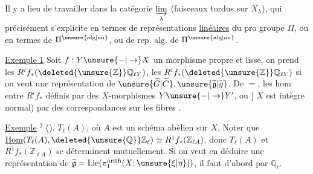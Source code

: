 Il y a lieu de travailler dans la catégorie $\underset{\lambda}{\varinjlim}$ (faisceaux  tordus sur $X_\lambda$), qui précisément s'explicite en termes de représentations \uline{linéaires}  du pro groupe $\Pi$, ou en termes de $\Pi^{\unsure{\mathrm{alg}|\mathrm{an}}}$, ou de rep. alg. de $\Pi^{\unsure{\mathrm{alg}|\mathrm{an}}}$.

\uline{Exemple 1} Soit $f:Y\unsure{-|\to}X$ un morphisme propre et lisse, on prend les $R^i f_*(\deleted{\unsure{\mathbb{Z}}}\mathbb{Q}_{\ell Y})$,   les $R^i f_*(\deleted{\unsure{\mathbb{Z}}}\mathbb{Q}_{\ell Y})$ si on veut une représentation de $\unsure{\widetilde G|\widetilde C},\unsure{\widetilde{\mathfrak g}|\widetilde g}$. De $=$, les hom entre $R^i f_*$ définis par des $X$-morphismes $Y\unsure{-|\to}Y'$, ou $[$ $X$ est intègre normal) par des  correspondances  sur les fibres .

\uline{Exemple} $^2$ (). $T_\ell(A)$, où $A$ est un schéma abélien sur $X$,  Noter que $\underline{\operatorname{Hom}}(T_\ell(A),\deleted{\unsure{\mathbb{Q}}}\mathbb{Z}_\ell)\simeq R^1 f_*(\mathbb{Z}_{\ell A})$, donc $T_\ell(A)$ et $R^1 f_*(\mathbb{Z}_{\ell A})$ se déterminent mutuellement.  Si on veut en déduire une représentation de $\widetilde{\mathfrak g}=\operatorname{Lie}(\pi_1^{\mathrm{arith}}(X;\unsure{\xi|\eta}))$, il faut  d'abord par $\mathbb{Q}_\ell$.
